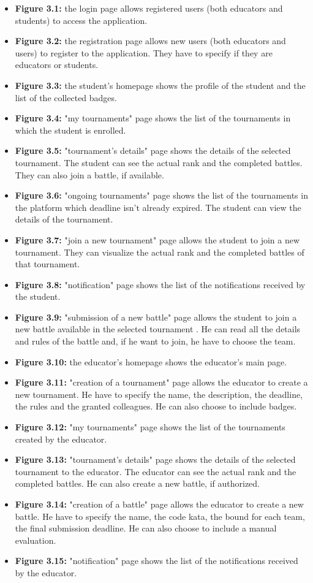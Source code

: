 \begin{itemize}
    \item \textbf{Figure 3.1:} the login page allows registered users (both educators and students) to access the application.
    \item \textbf{Figure 3.2:} the registration page allows new users (both educators and users) to register to the application. They have to specify if they are educators or students.
    \item \textbf{Figure 3.3:} the student's homepage shows the profile of the student and the list of the collected badges.
    \item \textbf{Figure 3.4:} "my tournaments" page shows the list of the tournaments in which the student is enrolled.
    \item \textbf{Figure 3.5:} "tournament's details" page shows the details of the selected tournament. The student can see the actual rank and the completed battles. They can also join a battle, if available.
    \item \textbf{Figure 3.6:} "ongoing tournaments" page shows the list of the tournaments in the platform which deadline isn't already expired. The student can view the details of the tournament.
    \item \textbf{Figure 3.7:} "join a new tournament" page allows the student to join a new tournament. They can visualize the actual rank and the completed battles of that tournament. 
    \item \textbf{Figure 3.8:} "notification" page shows the list of the notifications received by the student. 
    \item \textbf{Figure 3.9:} "submission of a new battle" page allows the student to join a new battle available in the selected tournament . He can read all the details and rules of the battle and, if he want to join, he have to choose the team.
    \item \textbf{Figure 3.10:} the educator's homepage shows the educator's main page.
    \item \textbf{Figure 3.11:} "creation of a tournament" page allows the educator to create a new tournament. He have to specify the name, the description, the deadline, the rules and the granted colleagues. He can also choose to include badges.
    \item \textbf{Figure 3.12:} "my tournaments" page shows the list of the tournaments created by the educator.
    \item \textbf{Figure 3.13:} "tournament's details" page shows the details of the selected tournament to the educator. The educator can see the actual rank and the completed battles. He can also create a new battle, if authorized.
    \item \textbf{Figure 3.14:} "creation of a battle" page allows the educator to create a new battle. He have to specify the name, the code kata, the bound for each team, the final submission deadline. He can also choose to include a manual evaluation.
    \item \textbf{Figure 3.15:} "notification" page shows the list of the notifications received by the educator.
\end{itemize}

